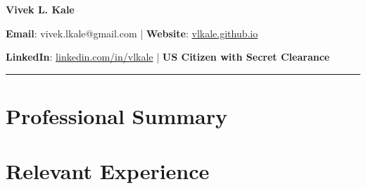 \documentclass[11pt]{article}
\begin{document}
 

\begin{center}
\selectfont
    \Large \textbf{Vivek L. Kale} \\
    \normalsize

    \textbf{Email}: vivek.lkale@gmail.com | 
      \textbf{Website}: \href{http://vlkale.github.io}{vlkale.github.io}
      
      \textbf{LinkedIn}: \href{http://linkedin.com/in/vlkale}{linkedin.com/in/vlkale} | \textbf{US Citizen with Secret Clearance}
\end{center}
\vspace{0.5cm}
\noindent\rule{\linewidth}{0.4pt}


%

\section*{\selectfont Professional Summary}


\section*{\selectfont Relevant Experience}
 

\end{document}

